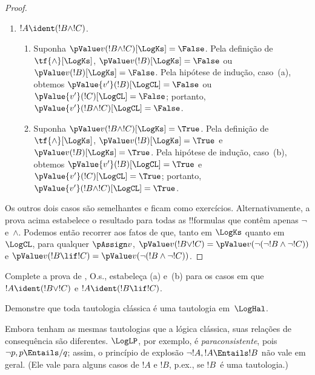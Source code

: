\documentclass[../../../include/open-logic-section]{subfiles}
\begin{document}
\begin{proof}
\begin{enumerate}
    \item $!A \ident (!B \land !C)$.
    \begin{enumerate}
      \item Suponha $\pValue v(!B \land !C)[\LogKs] = \False$. Pela
      definição de $\tf{\land}[\LogKs]$, $\pValue v(!B)[\LogKs]  =
      \False$ ou $\pValue v(!B)[\LogKs]  = \False$. Pela hipótese de
      indução, caso~(a), obtemos $\pValue {v'}(!B)[\LogCL]  = \False$
      ou $\pValue {v'}(!C)[\LogCL]  = \False$; portanto, $\pValue {v'}(!B \land
      !C)[\LogCL] = \False$.
      \item Suponha $\pValue v(!B \land !C)[\LogKs] = \True$. Pela
      definição de $\tf{\land}[\LogKs]$, $\pValue v(!B)[\LogKs]  =
      \True$ e $\pValue v(!B)[\LogKs]  = \True$. Pela hipótese de
      indução, caso~(b), obtemos $\pValue {v'}(!B)[\LogCL]  = \True$
      e $\pValue {v'}(!C)[\LogCL]  = \True$; portanto, $\pValue {v'}(!B \land
      !C)[\LogCL] = \True$.
    \end{enumerate}
  \end{enumerate}

  Os outros dois casos são semelhantes e ficam como exercícios. Alternativamente,
  a prova acima estabelece o resultado para todas as !!{formula}s que contêm
  apenas $\lnot$ e~$\land$. Podemos então recorrer aos fatos de que, tanto em
  $\LogKs$ quanto em $\LogCL$, para qualquer $\pAssign v$, $\pValue v(!B \lor
  !C) = \pValue v(\lnot(\lnot!B \land \lnot !C))$ e $\pValue v(!B \lif
  !C) = \pValue v(\lnot(!B \land \lnot !C))$.
\end{proof}

\begin{prob}
  Complete a prova de , O.s.\@,
  estabeleça (a) e~(b) para os casos em que $!A \ident (!B \lor !C)$
  e $!A \ident (!B \lif !C)$.
\end{prob}

\begin{prob}
Demonstre que toda tautologia clássica é uma tautologia em~$\LogHal$.
\end{prob}

Embora tenham as mesmas tautologias que a lógica clássica, suas
relações de consequência são diferentes. $\LogLP$, por exemplo, é
\emph{paraconsistente}, pois $\lnot p, p \Entails/ q$; assim, o
princípio de explosão $\lnot !A, !A \Entails !B$ não vale em
geral. (Ele vale para alguns casos de $!A$ e $!B$, p.ex., se $!B$~é uma
tautologia.)
\end{document}
